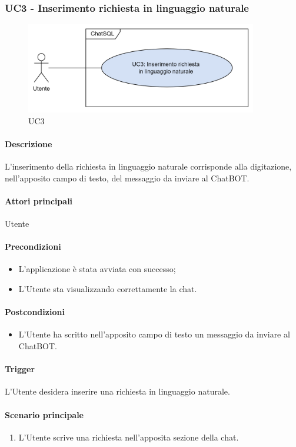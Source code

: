 \subsubsection{UC3 - Inserimento richiesta in linguaggio naturale}\label{UC3}

\begin{figure}[H]
  \centering
  \includegraphics[width=0.90\textwidth]{assets/uc3.png}
  \caption{UC3}
\end{figure}

\paragraph*{Descrizione}
L'inserimento della richiesta in linguaggio naturale corrisponde alla digitazione, nell'apposito campo di testo, del messaggio da inviare al ChatBOT.

\paragraph*{Attori principali}
Utente

\paragraph*{Precondizioni}
\begin{itemize}
  \item L'applicazione è stata avviata con successo;
  \item L'Utente sta visualizzando correttamente la chat.
\end{itemize}

\paragraph*{Postcondizioni}
\begin{itemize}
  \item L'Utente ha scritto nell'apposito campo di testo un messaggio da inviare al ChatBOT.
\end{itemize}

\paragraph*{Trigger}
L'Utente desidera inserire una richiesta in linguaggio naturale.

\paragraph*{Scenario principale}
\begin{enumerate}
  \item L'Utente scrive una richiesta nell'apposita sezione della chat.
\end{enumerate}
